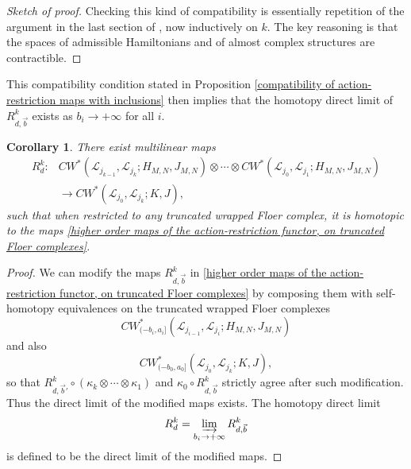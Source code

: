 \documentclass{amsart}
\newtheorem{corollary}[theorem]{Corollary}
\numberwithin{equation}{section}
\numberwithin{figure}{section}
\begin{document}
\begin{proof}[Sketch of proof]
	Checking this kind of compatibility is essentially repetition of the argument in the last section of \cite{Gao1}, now inductively on $k$. The key reasoning is that the spaces of admissible Hamiltonians and of almost complex structures are contractible. 
\end{proof}

	This compatibility condition stated in Proposition \ref{compatibility of action-restriction maps with inclusions} then implies that the homotopy direct limit of $R^{k}_{d, \vec{b}}$ exists as $b_{i} \to +\infty$ for all $i$. \par

\begin{corollary}
	There exist multilinear maps
\begin{equation}
\begin{split}
R^{k}_{d}: &CW^{*}(\mathcal{L}_{j_{k-1}}, \mathcal{L}_{j_{k}}; H_{M, N}, J_{M, N}) \otimes \cdots \otimes CW^{*}(\mathcal{L}_{j_{0}}, \mathcal{L}_{j_{1}}; H_{M, N}, J_{M, N})\\
&\to CW^{*}(\mathcal{L}_{j_{0}}, \mathcal{L}_{j_{k}}; K, J),
\end{split}
\end{equation}
such that when restricted to any truncated wrapped Floer complex, it is homotopic to the maps \eqref{higher order maps of the action-restriction functor, on truncated Floer complexes}.
\end{corollary}
\begin{proof}
	We can modify the maps $R_{d, \vec{b}}^{k}$ in \eqref{higher order maps of the action-restriction functor, on truncated Floer complexes} by composing them with self-homotopy equivalences on the truncated wrapped Floer complexes 
\begin{equation*}
CW^{*}_{(-b_{i}, a_{i}]}(\mathcal{L}_{j_{i-1}}, \mathcal{L}_{j_{i}}; H_{M, N}, J_{M, N})
\end{equation*}
and also
\begin{equation*}
CW^{*}_{(-b_{0}, a_{0}]}(\mathcal{L}_{j_{0}}, \mathcal{L}_{j_{k}}; K, J),
\end{equation*}
so that $R_{d, \vec{b}'}^{k} \circ (\kappa_{k} \otimes \cdots \otimes \kappa_{1})$ and $\kappa_{0} \circ R_{d, \vec{b}}^{k}$ strictly agree after such modification. Thus the direct limit of the modified maps exists. The homotopy direct limit 
\begin{equation}
R^{k}_{d} = \varinjlim_{b_{i} \to +\infty}R^{k}_{d, \vec{b}}
\end{equation}
is defined to be the direct limit of the modified maps. 
\end{proof}
\end{document}
